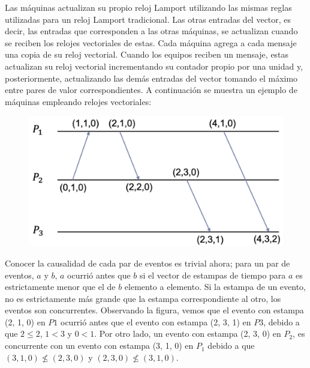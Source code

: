 \documentclass[12pt]{article}
\begin{document}
Las máquinas actualizan su propio reloj Lamport utilizando las mismas reglas utilizadas para un reloj Lamport tradicional.
Las otras entradas del vector,
es decir,
las entradas que corresponden a las otras máquinas,
se actualizan cuando se reciben los relojes vectoriales de estas.
Cada máquina agrega a cada mensaje una copia de su reloj vectorial.
Cuando los equipos reciben un mensaje,
estas actualizan su reloj vectorial incrementando su contador propio por una unidad y,
posteriormente,
actualizando las demás entradas del vector tomando el máximo entre pares de valor correspondientes.
A continuación se muestra un ejemplo de máquinas empleando relojes vectoriales:

\begin{figure}[h]
   \centering
   \includegraphics[scale=0.5]{vector_clocks.png}
\end{figure}

Conocer la causalidad de cada par de eventos es trivial ahora;
para un par de eventos,
$a$ y $b$,
$a$ ocurrió antes que $b$ si el vector de estampas de tiempo para $a$ es estrictamente menor que el de $b$ elemento a elemento.
Si la estampa de un evento,
no es estrictamente más grande que la estampa correspondiente al otro,
los eventos son concurrentes.
Observando la figura,
vemos que el evento con estampa (2, 1, 0) en $P1$
ocurrió antes que el evento con estampa (2, 3, 1) en $P3$,
debido a que $2 \leqslant 2$,
$1 < 3$
y
$0 < 1$.
Por otro lado,
un evento con estampa (2, 3, 0) en $P_2$,
es concurrente con un evento con estampa (3, 1, 0) en $P_1$ debido a que
$(3, 1, 0) \nleqslant (2, 3, 0)$
y
$(2, 3, 0) \nleqslant (3, 1, 0)$.
\end{document}
